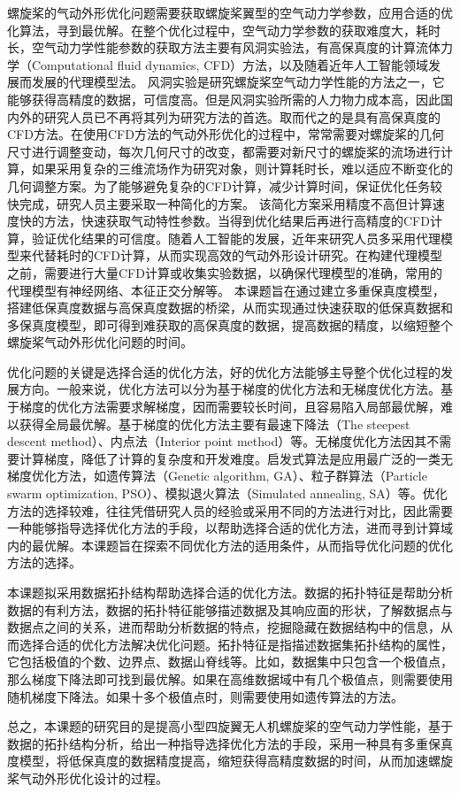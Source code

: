 螺旋桨的气动外形优化问题需要获取螺旋桨翼型的空气动力学参数，应用合适的优化算法，寻到最优解。在整个优化过程中，空气动力学参数的获取难度大，耗时长，空气动力学性能参数的获取方法主要有风洞实验法，有高保真度的计算流体力学（Computational fluid dynamics, CFD）方法，以及随着近年人工智能领域发展而发展的代理模型法。
风洞实验是研究螺旋桨空气动力学性能的方法之一，它能够获得高精度的数据，可信度高。但是风洞实验所需的人力物力成本高，因此国内外的研究人员已不再将其列为研究方法的首选。取而代之的是具有高保真度的CFD方法。在使用CFD方法的气动外形优化的过程中，常常需要对螺旋桨的几何尺寸进行调整变动，每次几何尺寸的改变，都需要对新尺寸的螺旋桨的流场进行计算，如果采用复杂的三维流场作为研究对象，则计算耗时长，难以适应不断变化的几何调整方案。为了能够避免复杂的CFD计算，减少计算时间，保证优化任务较快完成，研究人员主要采取一种简化的方案。
该简化方案采用精度不高但计算速度快的方法，快速获取气动特性参数。当得到优化结果后再进行高精度的CFD计算，验证优化结果的可信度。随着人工智能的发展，近年来研究人员多采用代理模型来代替耗时的CFD计算，从而实现高效的气动外形设计研究。在构建代理模型之前，需要进行大量CFD计算或收集实验数据，以确保代理模型的准确，常用的代理模型有神经网络、本征正交分解等。
本课题旨在通过建立多重保真度模型，搭建低保真度数据与高保真度数据的桥梁，从而实现通过快速获取的低保真数据和多保真度模型，即可得到难获取的高保真度的数据，提高数据的精度，以缩短整个螺旋桨气动外形优化问题的时间。

优化问题的关键是选择合适的优化方法，好的优化方法能够主导整个优化过程的发展方向。一般来说，优化方法可以分为基于梯度的优化方法和无梯度优化方法。基于梯度的优化方法需要求解梯度，因而需要较长时间，且容易陷入局部最优解，难以获得全局最优解。基于梯度的优化方法主要有最速下降法（The steepest descent method）、内点法（Interior point method）等。无梯度优化方法因其不需要计算梯度，降低了计算的复杂度和开发难度。启发式算法是应用最广泛的一类无梯度优化方法，如遗传算法（Genetic algorithm, GA）、粒子群算法（Particle swarm optimization, PSO）、模拟退火算法（Simulated annealing, SA）等。优化方法的选择较难，往往凭借研究人员的经验或采用不同的方法进行对比，因此需要一种能够指导选择优化方法的手段，以帮助选择合适的优化方法，进而寻到计算域内的最优解。本课题旨在探索不同优化方法的适用条件，从而指导优化问题的优化方法的选择。

本课题拟采用数据拓扑结构帮助选择合适的优化方法。数据的拓扑特征是帮助分析数据的有利方法，数据的拓扑特征能够描述数据及其响应面的形状，了解数据点与数据点之间的关系，进而帮助分析数据的特点，挖掘隐藏在数据结构中的信息，从而选择合适的优化方法解决优化问题。拓扑特征是指描述数据集拓扑结构的属性，它包括极值的个数、边界点、数据山脊线等。比如，数据集中只包含一个极值点，那么梯度下降法即可找到最优解。如果在高维数据域中有几个极值点，则需要使用随机梯度下降法。如果十多个极值点时，则需要使用如遗传算法的方法。

总之，本课题的研究目的是提高小型四旋翼无人机螺旋桨的空气动力学性能，基于数据的拓扑结构分析，给出一种指导选择优化方法的手段，采用一种具有多重保真度模型，将低保真度的数据精度提高，缩短获得高精度数据的时间，从而加速螺旋桨气动外形优化设计的过程。